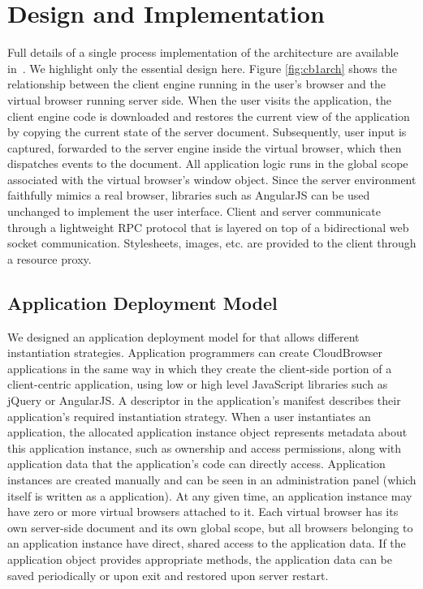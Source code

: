 \section{Design and Implementation}
\label{sec:implementation}

Full details of a single process implementation of the \cb architecture
are available in~\cite{mcdaniel2012cloudbrowser}.  We highlight only the
essential design here.  Figure \ref{fig:cb1arch} shows the relationship 
between the client engine running in the user's browser and the virtual browser
running server side.  When the user visits the application, the client engine
code is downloaded and restores the current view of the application by
copying the current state of the server document.  Subsequently, user input 
is captured, forwarded to the server engine inside the virtual browser, 
which then dispatches events to the document.  All application logic runs
in the global scope associated with the virtual browser's window object.
Since the server environment faithfully mimics a real browser, libraries
such as AngularJS can be used unchanged to implement the user interface.
Client and server communicate through a lightweight RPC protocol that is 
layered on top of a bidirectional web socket communication. 
Stylesheets, images, etc. are provided to the client through a resource
proxy.

\subsection{Application Deployment Model}
\label{sec:appmodel}

We designed an application deployment model for \cbtwo{} that allows different
instantiation strategies.
Application programmers can create CloudBrowser applications in the same way in which 
they create the client-side portion of a client-centric application, using low or high level
JavaScript libraries such as jQuery or AngularJS.  A descriptor in the application's
manifest describes their application's required instantiation strategy.
When a user instantiates an application, the allocated application instance object 
represents metadata about this application
instance, such as ownership and access permissions, along with application data that
the application's code can directly access.  Application instances are created manually
and can be seen in an administration panel (which itself is written as a \cb application).
At any given time, an application instance may have zero or more virtual browsers attached 
to it.  Each virtual browser has its own server-side document and its own global scope, 
but all browsers belonging to an application instance have direct, shared access to the 
application data.  If the application object provides appropriate methods, the application 
data can be saved periodically or upon exit and restored upon server restart.

